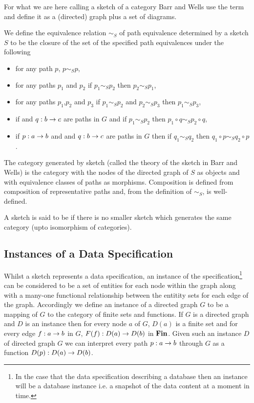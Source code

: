 For what we are here calling a sketch of a category Barr and Wells use the term  and define it as a (directed) graph plus a set of diagrams.

We define the equivalence relation $\sim_S$ of path equivalence determined by a sketch $S$ to be the closure of the set of the specified path equivalences under the following

\begin{itemize}
\item for any path $p$, $p \sim_S p$,
\item for any paths $p_1$ and $p_2$ if $p_1 \sim_S p_2$ then $p_2 \sim_S p_1$,
\item for any paths $p_1$,$p_2$ and $p_3$ if $p_1 \sim_S p_2$ and $p_2 \sim_S p_3$ then $p_1 \sim_S p_3$,
\item if  and $q: b \rightarrow c$ are paths in $G$ and if $p_1 \sim_S p_2$  
then $p_1 \circ q \sim_S p_2 \circ q$,
\item if $p: a \rightarrow b$ and  and $q: b \rightarrow c$ are paths in $G$ then if $q_1 \sim_S q_2$  
then $q_1 \circ p \sim_S q_2 \circ p$.
\end{itemize}

The category generated by sketch (called the theory of the sketch in Barr and Wells) is the category with
the nodes of the directed graph of $S$ as objects and with equivalence classes of paths as morphisms.
Composition is defined from composition of representative paths and, from the definition of $\sim_S$, is well-defined.

A sketch is said to be  
if there is no smaller sketch which generates the same category (upto isomorphism of categories).

\subsection{Instances of a Data Specification}
Whilst a sketch represents a data specification, an instance of the specification\footnote{In the case that the data specification describing a database then an instance will be a database instance i.e. a snapshot of the data content at a moment in time.} can be considered to be a set of entities for each node within the graph
along with a many-one functional relationship between the entitity sets for each edge of the graph. 
Accordingly we define an instance of a directed graph $G$ to be a mapping of $G$ to the category of finite sets and functions.
If $G$ is a directed graph and $D$ is an instance then for every node $a$ of $G$, $D(a)$ is a finite set
and for every edge $f:a \rightarrow b$ in $G$, $F(f):D(a) \rightarrow D(b)$ in $\textbf{Fin}$. Given such an instance $D$ of 
directed graph $G$ 
we can interpret every path $p:a \rightarrow b$ through $G$ as a function $D(p): D(a) \rightarrow D(b)$.

